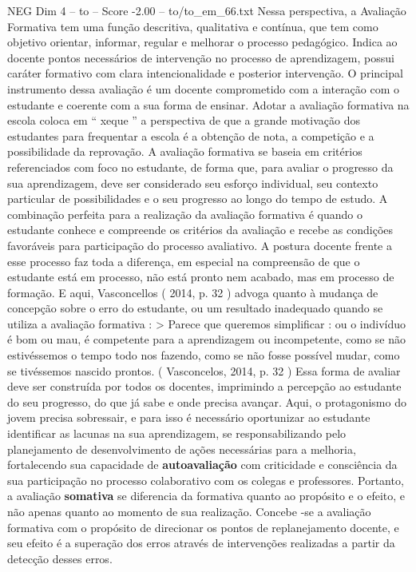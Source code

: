 \begin{textsample}{NEG Dim 4 – to – Score -2.00 – to/to\_em\_66.txt}
Nessa perspectiva, a Avaliação Formativa tem uma função descritiva, qualitativa e contínua, que tem como objetivo orientar, informar, regular e melhorar o processo pedagógico.
Indica ao docente pontos necessários de intervenção no processo de aprendizagem, possui caráter formativo com clara intencionalidade e posterior intervenção.
O principal instrumento dessa avaliação é um docente comprometido com a interação com o estudante e coerente com a sua forma de ensinar.
Adotar a avaliação formativa na escola coloca em “ xeque ” a perspectiva de que a grande motivação dos estudantes para frequentar a escola é a obtenção de nota, a competição e a possibilidade da reprovação.
A avaliação formativa se baseia em critérios referenciados com foco no estudante, de forma que, para avaliar o progresso da sua aprendizagem, deve ser considerado seu esforço individual, seu contexto particular de possibilidades e o seu progresso ao longo do tempo de estudo.
A combinação perfeita para a realização da avaliação formativa é quando o estudante conhece e compreende os critérios da avaliação e recebe as condições favoráveis para participação do processo avaliativo.
A postura docente frente a esse processo faz toda a diferença, em especial na compreensão de que o estudante está em processo, não está pronto nem acabado, mas em processo de formação.
E aqui, Vasconcellos ( 2014, p. 32 ) advoga quanto à mudança de concepção sobre o erro do estudante, ou um resultado inadequado quando se utiliza a avaliação formativa : > Parece que queremos simplificar : ou o indivíduo é bom ou mau, é competente para a aprendizagem ou incompetente, como se não estivéssemos o tempo todo nos fazendo, como se não fosse possível mudar, como se tivéssemos nascido prontos. ( Vasconcelos, 2014, p. 32 ) Essa forma de avaliar deve ser construída por todos os docentes, imprimindo a percepção ao estudante do seu progresso, do que já sabe e onde precisa avançar.
Aqui, o protagonismo do jovem precisa sobressair, e para isso é necessário oportunizar ao estudante identificar as lacunas na sua aprendizagem, se responsabilizando pelo planejamento de desenvolvimento de ações necessárias para a melhoria, fortalecendo sua capacidade de \textbf{autoavaliação} com criticidade e consciência da sua participação no processo colaborativo com os colegas e professores.
Portanto, a avaliação \textbf{somativa} se diferencia da formativa quanto ao propósito e o efeito, e não apenas quanto ao momento de sua realização.
Concebe -se a avaliação formativa com o propósito de direcionar os pontos de replanejamento docente, e seu efeito é a superação dos erros através de intervenções realizadas a partir da detecção desses erros.

\end{textsample}
